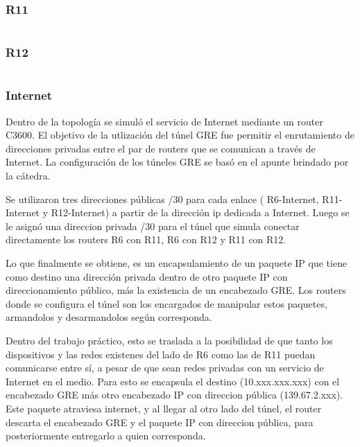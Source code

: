 \documentclass[12pt, a4paper, spanish]{article}
\begin{document}
\subsubsection{R11}
{\small
\begin{verbatim}

\end{verbatim}
}

\subsubsection{R12}
{\small
\begin{verbatim}

\end{verbatim}
}

\subsubsection{Internet}

Dentro de la topología se simuló el servicio de Internet mediante un 
router C3600.
El objetivo de la utlización del túnel GRE fue permitir el enrutamiento de 
direcciones privadas entre el par de routers que se comunican a través de 
Internet.
La configuración de los túneles GRE se basó en el apunte brindado por la 
cátedra. 

Se utilizaron tres direcciones públicas /30 para cada enlace ( R6-Internet, 
R11-Internet y R12-Internet) a partir de la dirección ip dedicada a Internet.
Luego se le asignó una direccion privada /30 para el túnel que simula 
conectar directamente los routers R6 con R11, R6 con R12 y R11 con R12. 

Lo que finalmente se obtiene, es un encapsulamiento de un paquete IP que 
tiene como destino una dirección privada dentro de otro paquete IP con 
direccionamiento público, más la existencia de un encabezado GRE.
Los routers donde se configura el túnel son los encargados de manipular estos 
paquetes, armandolos y desarmandolos según corresponda.

Dentro del trabajo práctico, esto se traslada a la posibilidad de que tanto 
los dispositivos y las redes existenes del lado de R6 como las de R11 puedan 
comunicarse entre sí, a pesar de que sean redes privadas con un servicio de 
Internet en el medio.
Para esto se encapsula el destino (10.xxx.xxx.xxx) con el encabezado GRE más 
otro encabezado IP con direccion pública (139.67.2.xxx).
Este paquete atraviesa internet, y al llegar al otro lado del túnel, 
el router descarta el encabezado GRE y el paquete IP con direccion pública, 
para posteriormente entregarlo a quien corresponda.
\end{document}
